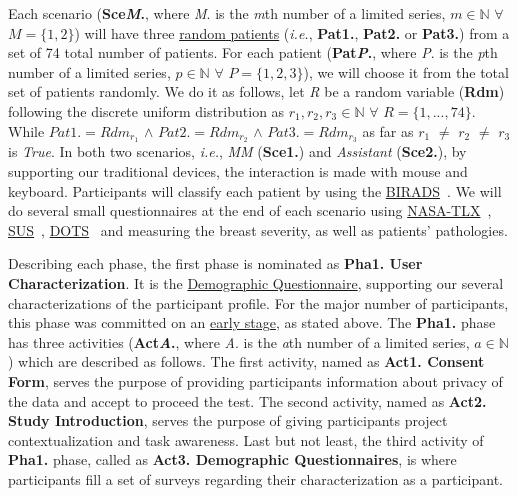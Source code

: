 Each scenario (\textbf{Sce\textit{M}.}, where \textit{M}. is the \textit{m}th number of a limited series, $m \in \mathbb{N}$ $\forall$ $M = \{1, 2\}$) will have three \hyperlink{https://github.com/mida-project/finders-datasets/tree/master/results/users/uta7}{random patients} (\textit{i.e.}, \textbf{Pat1.}, \textbf{Pat2.} or \textbf{Pat3.}) from a set of 74 total number of patients. For each patient (\textbf{Pat\textit{P}.}, where \textit{P}. is the \textit{p}th number of a limited series, $p \in \mathbb{N}$ $\forall$ $P = \{1, 2, 3\}$), we will choose it from the total set of patients randomly. We do it as follows, let \textit{R} be a random variable (\textbf{Rdm}) following the discrete uniform distribution as $r_{1}, r_{2}, r_{3} \in \mathbb{N}$ $\forall$ $R = \{1, ..., 74\}$. While $Pat1. = Rdm_{r_{1}}$ $\wedge$ $Pat2. = Rdm_{r_{2}}$ $\wedge$ $Pat3. = Rdm_{r_{3}}$ as far as $r_{1}$ $\neq$ $r_{2}$ $\neq$ $r_{3}$ is \textit{True}. In both two scenarios, \textit{i.e.}, {\it \gls{MM}} (\textbf{Sce1.}) and \textit{Assistant} (\textbf{Sce2.}), by supporting our traditional devices, the interaction is made with mouse and keyboard. Participants will classify each patient by using the \hyperlink{https://en.wikipedia.org/wiki/BI-RADS}{BIRADS}~\cite{balleyguier2007birads}. We will do several small questionnaires at the end of each scenario using \hyperlink{https://en.wikipedia.org/wiki/NASA-TLX}{NASA-TLX}~\cite{ramkumar2017using}, \hyperlink{https://en.wikipedia.org/wiki/System_usability_scale}{SUS}~\cite{orfanou2015perceived}, \hyperlink{https://psycnet.apa.org/record/1995-45592-001}{DOTS}~\cite{mayer1995integrative} and measuring the breast severity, as well as patients' pathologies.

Describing each phase, the first phase is nominated as \textbf{Pha1. User Characterization}. It is the \hyperlink{https://docs.google.com/spreadsheets/d/1h-4neEo3RbYsJs3JHBGvogHCvz3UFnMvsmoernfCuDU/edit?usp=sharing}{Demographic Questionnaire}, supporting our several characterizations of the participant profile. For the major number of participants, this phase was committed on an \hyperlink{https://github.com/MIMBCD-UI/testing-guide-breast/tree/master/samples/test_4}{early stage}, as stated above. The \textbf{Pha1.} phase has three activities (\textbf{Act\textit{A}.}, where \textit{A}. is the \textit{a}th number of a limited series, $a \in \mathbb{N}$) which are described as follows. The first activity, named as \textbf{Act1. Consent Form}, serves the purpose of providing participants information about privacy of the data and accept to proceed the test. The second activity, named as \textbf{Act2. Study Introduction}, serves the purpose of giving participants project contextualization and task awareness. Last but not least, the third activity of \textbf{Pha1.} phase, called as \textbf{Act3. Demographic Questionnaires}, is where participants fill a set of surveys regarding their characterization as a participant.

